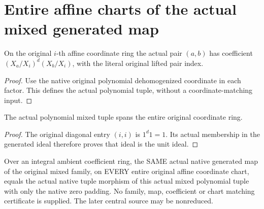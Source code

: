 \section{Entire affine charts of the actual mixed generated map}
\begin{definition}
\label{def:central-embedding-actual-polynomial-mixed-tuple}
\leanok
On the original $i$-th affine coordinate ring the actual pair $(a,b)$ has
coefficient $(X_a/X_i)^d(X_b/X_i)$, with the literal original lifted pair index.
\end{definition}
\begin{proof}
Use the native original polynomial dehomogenized coordinate in each factor.
This defines the actual polynomial tuple, without a coordinate-matching input.
\end{proof}
\begin{lemma}
\label{lem:central-embedding-actual-polynomial-mixed-tuple-unit-span}
\leanok
The actual polynomial mixed tuple spans the entire original coordinate ring.
\end{lemma}
\begin{proof}
The original diagonal entry $(i,i)$ is $1^d1=1$. Its actual membership in the
generated ideal therefore proves that ideal is the unit ideal.
\end{proof}
\begin{lemma}
\label{lem:central-embedding-same-mixed-projective-map-entire-chart}
\leanok
Over an integral ambient coefficient ring, the SAME actual native generated
map of the original mixed family, on EVERY entire original affine coordinate
chart, equals the actual native tuple morphism of this actual mixed polynomial
tuple with only the native zero padding. No family, map, coefficient or chart
matching certificate is supplied. The later central source may be nonreduced.
\end{lemma}
